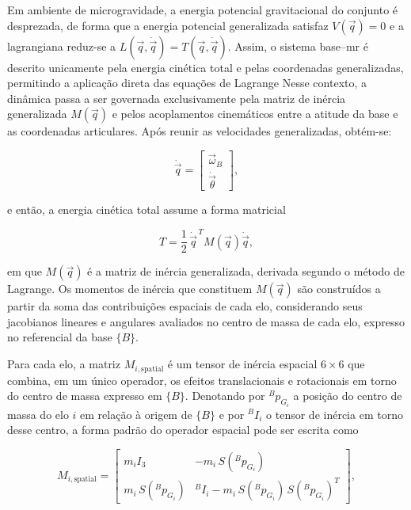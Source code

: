 Em ambiente de microgravidade, a energia potencial gravitacional do conjunto é desprezada, de forma que a energia potencial generalizada satisfaz $V(\vec q) = 0$ e a lagrangiana reduz-se a $L(\vec q,\dot{\vec q}) = T(\vec q,\dot{\vec q})$.
Assim, o sistema base--\gls{mr} é descrito unicamente pela energia cinética total e pelas coordenadas generalizadas, permitindo a aplicação direta das equações de Lagrange
Nesse contexto, a dinâmica passa a ser governada exclusivamente pela matriz de inércia generalizada $M(\vec q)$ e pelos acoplamentos cinemáticos entre a atitude da base e as coordenadas articulares.
Após reunir as velocidades generalizadas, obtém-se:

\begin{equation}
\dot{\vec q} =
\begin{bmatrix}
\vec\omega_{B} \\
\dot{\vec\theta}
\end{bmatrix},
\end{equation}

e então, a energia cinética total assume a forma matricial

\begin{equation}
T = \frac{1}{2}\,\dot{\vec q}^{\,T} M(\vec q) \dot{\vec q},
\label{eq:T_matriz}
\end{equation}

em que $M(\vec q)$ é a matriz de inércia generalizada, derivada segundo o método de Lagrange.
Os momentos de inércia que constituem $M(\vec q)$ são construídos a partir da soma das contribuições espaciais de cada elo, considerando seus jacobianos lineares e angulares avaliados no centro de massa de cada elo, expresso no referencial da base $\{B\}$.

Para cada elo, a matriz $M_{i,\text{spatial}}$ é um tensor de inércia espacial $6\times 6$ que combina, em um único operador, os efeitos translacionais e rotacionais em torno do centro de massa expresso em $\{B\}$.
Denotando por ${}^{B}\!p_{G_i}$ a posição do centro de massa do elo $i$ em relação à origem de $\{B\}$ e por ${}^{B}\!I_i$ o tensor de inércia em torno desse centro, a forma padrão do operador espacial pode ser escrita como

\begin{equation}
M_{i,\text{spatial}}
=
\begin{bmatrix}
m_i I_3 & -m_i\,S({}^{B}\!p_{G_i})\\[2pt]
m_i\,S({}^{B}\!p_{G_i}) & {}^{B}\!I_i - m_i\,S({}^{B}\!p_{G_i})\,S({}^{B}\!p_{G_i})^{T}
\end{bmatrix},
\end{equation}

